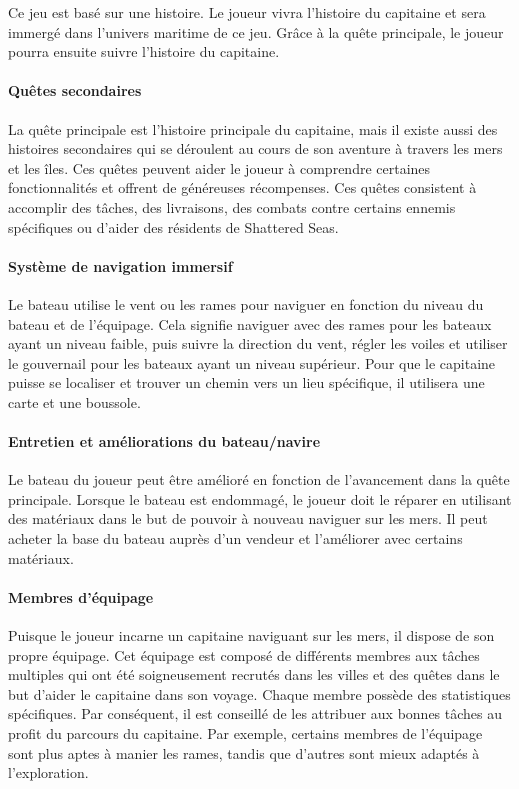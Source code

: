 \documentclass{article}
\begin{document}
Ce jeu est basé sur une histoire. Le joueur vivra l'histoire du capitaine et sera immergé dans l'univers maritime de ce jeu. Grâce à la quête principale, le joueur pourra ensuite suivre l'histoire du capitaine.

\paragraph{Quêtes secondaires}\hfill

La quête principale est l'histoire principale du capitaine, mais il existe aussi des histoires secondaires qui se déroulent au cours de son aventure à travers les mers et les îles. Ces quêtes peuvent aider le joueur à comprendre certaines fonctionnalités et offrent de généreuses récompenses. Ces quêtes consistent à accomplir des tâches, des livraisons, des combats contre certains ennemis spécifiques ou d'aider des résidents de Shattered Seas.

\paragraph{Système de navigation immersif}\hfill

Le bateau utilise le vent ou les rames pour naviguer en fonction du niveau du bateau et de l'équipage. Cela signifie naviguer avec des rames pour les bateaux ayant un niveau faible, puis suivre la direction du vent, régler les voiles et utiliser le gouvernail pour les bateaux ayant un niveau supérieur. Pour que le capitaine puisse se localiser et trouver un chemin vers un lieu spécifique, il utilisera une carte et une boussole.

\paragraph{Entretien et améliorations du bateau/navire}\hfill

Le bateau du joueur peut être amélioré en fonction de l’avancement dans la quête principale. Lorsque le bateau est endommagé, le joueur doit le réparer en utilisant des matériaux dans le but de pouvoir à nouveau naviguer sur les mers. Il peut acheter la base du bateau auprès d'un vendeur et l'améliorer avec certains matériaux.

\paragraph{Membres d’équipage}\hfill

Puisque le joueur incarne un capitaine naviguant sur les mers, il dispose de son propre équipage. Cet équipage est composé de différents membres aux tâches multiples qui ont été soigneusement recrutés dans les villes et des quêtes dans le but d'aider le capitaine dans son voyage. Chaque membre possède des statistiques spécifiques. Par conséquent, il est conseillé de les attribuer aux bonnes tâches au profit du parcours du capitaine. Par exemple, certains membres de l’équipage sont plus aptes à manier les rames, tandis que d’autres sont mieux adaptés à l’exploration.
\end{document}
